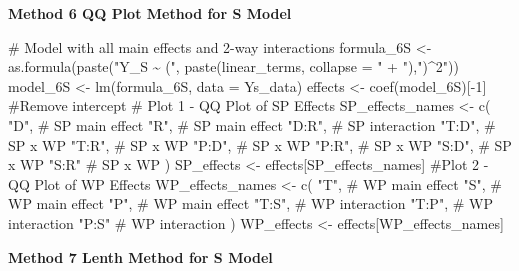 \documentclass[
  letterpaper,
  DIV=11,
  numbers=noendperiod]{scrartcl}
\newenvironment{Shaded}{\begin{snugshade}}{\end{snugshade}}
\newcommand{\AttributeTok}[1]{\textcolor[rgb]{0.40,0.45,0.13}{#1}}
\newcommand{\CommentTok}[1]{\textcolor[rgb]{0.37,0.37,0.37}{#1}}
\newcommand{\DecValTok}[1]{\textcolor[rgb]{0.68,0.00,0.00}{#1}}
\newcommand{\FunctionTok}[1]{\textcolor[rgb]{0.28,0.35,0.67}{#1}}
\newcommand{\NormalTok}[1]{\textcolor[rgb]{0.00,0.23,0.31}{#1}}
\newcommand{\OtherTok}[1]{\textcolor[rgb]{0.00,0.23,0.31}{#1}}
\newcommand{\SpecialCharTok}[1]{\textcolor[rgb]{0.37,0.37,0.37}{#1}}
\newcommand{\StringTok}[1]{\textcolor[rgb]{0.13,0.47,0.30}{#1}}
\begin{document}
\textbf{Method 6 QQ Plot Method for S Model}

\begin{Shaded}
\begin{Highlighting}[]
\CommentTok{\# Model with all main effects and 2{-}way interactions}
\NormalTok{formula\_6S }\OtherTok{\textless{}{-}} \FunctionTok{as.formula}\NormalTok{(}\FunctionTok{paste}\NormalTok{(}\StringTok{"Y\_S \textasciitilde{} ("}\NormalTok{, }
    \FunctionTok{paste}\NormalTok{(linear\_terms, }\AttributeTok{collapse =} \StringTok{" + "}\NormalTok{),}\StringTok{")\^{}2"}\NormalTok{))}
\NormalTok{model\_6S }\OtherTok{\textless{}{-}} \FunctionTok{lm}\NormalTok{(formula\_6S, }\AttributeTok{data =}\NormalTok{ Ys\_data)  }
\NormalTok{effects }\OtherTok{\textless{}{-}} \FunctionTok{coef}\NormalTok{(model\_6S)[}\SpecialCharTok{{-}}\DecValTok{1}\NormalTok{]   }\CommentTok{\#Remove intercept}
\CommentTok{\# Plot 1 {-} QQ Plot of SP Effects}
\NormalTok{SP\_effects\_names }\OtherTok{\textless{}{-}} \FunctionTok{c}\NormalTok{(}
  \StringTok{"D"}\NormalTok{,    }\CommentTok{\# SP main effect}
  \StringTok{"R"}\NormalTok{,    }\CommentTok{\# SP main effect}
  \StringTok{"D:R"}\NormalTok{,  }\CommentTok{\# SP interaction}
  \StringTok{"T:D"}\NormalTok{,  }\CommentTok{\# SP x WP}
  \StringTok{"T:R"}\NormalTok{,  }\CommentTok{\# SP x WP}
  \StringTok{"P:D"}\NormalTok{,  }\CommentTok{\# SP x WP}
  \StringTok{"P:R"}\NormalTok{,  }\CommentTok{\# SP x WP}
  \StringTok{"S:D"}\NormalTok{,  }\CommentTok{\# SP x WP}
  \StringTok{"S:R"}   \CommentTok{\# SP x WP}
\NormalTok{)}
\NormalTok{SP\_effects }\OtherTok{\textless{}{-}}\NormalTok{ effects[SP\_effects\_names]}
\CommentTok{\#Plot 2 {-} QQ Plot of WP Effects}
\NormalTok{WP\_effects\_names }\OtherTok{\textless{}{-}} \FunctionTok{c}\NormalTok{(}
  \StringTok{"T"}\NormalTok{,    }\CommentTok{\# WP main effect}
  \StringTok{"S"}\NormalTok{,    }\CommentTok{\# WP main effect}
  \StringTok{"P"}\NormalTok{,    }\CommentTok{\# WP main effect}
  \StringTok{"T:S"}\NormalTok{,  }\CommentTok{\# WP interaction}
  \StringTok{"T:P"}\NormalTok{,  }\CommentTok{\# WP interaction}
  \StringTok{"P:S"}   \CommentTok{\# WP interaction}
\NormalTok{)}
\NormalTok{WP\_effects }\OtherTok{\textless{}{-}}\NormalTok{ effects[WP\_effects\_names]}
\end{Highlighting}
\end{Shaded}

\textbf{Method 7 Lenth Method for S Model}
\end{document}
